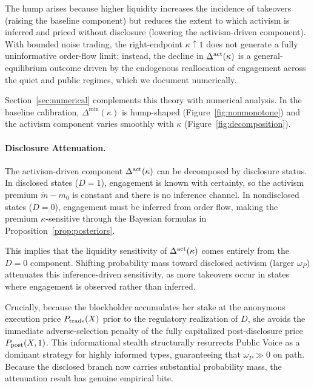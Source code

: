 \documentclass[11pt]{article}
\newcommand{\1}{\mathbf{1}}
\begin{document}
The hump arises because higher liquidity increases the incidence of takeovers (raising the baseline component) but reduces the extent to which activism is inferred and priced without disclosure (lowering the activism-driven component). With bounded noise trading, the right-endpoint $\kappa\uparrow 1$ does not generate a fully uninformative order-flow limit; instead, the decline in $\Delta^{\textup{act}}(\kappa)$ is a general-equilibrium outcome driven by the endogenous reallocation of engagement across the quiet and public regimes, which we document numerically.

Section~\ref{sec:numerical} complements this theory with numerical analysis. In the baseline calibration, $\Delta^{\min}(\kappa)$ is hump-shaped (Figure~\ref{fig:nonmonotone}) and the activism component varies smoothly with $\kappa$ (Figure~\ref{fig:decomposition}).

%
\paragraph{Disclosure Attenuation.}
%

The activism-driven component $\Delta^{\textup{act}}(\kappa)$ can be decomposed by disclosure status. In disclosed states ($D=1$), engagement is known with certainty, so the activism premium $\tilde{m}-m_0$ is constant and there is no inference channel. In nondisclosed states ($D=0$), engagement must be inferred from order flow, making the premium $\kappa$-sensitive through the Bayesian formulas in Proposition~\ref{prop:posteriors}.

This implies that the liquidity sensitivity of $\Delta^{\textup{act}}(\kappa)$ comes entirely from the $D=0$ component. Shifting probability mass toward disclosed activism (larger $\omega_P$) attenuates this inference-driven sensitivity, as more takeovers occur in states where engagement is observed rather than inferred.

Crucially, because the blockholder accumulates her stake at the anonymous execution price $P_{\textup{trade}}(X)$ prior to the regulatory realization of $D$, she avoids the immediate adverse-selection penalty of the fully capitalized post-disclosure price $P_{\textup{post}}(X,1)$. This informational stealth structurally resurrects Public Voice as a dominant strategy for highly informed types, guaranteeing that $\omega_P \gg 0$ on path. Because the disclosed branch now carries substantial probability mass, the attenuation result has genuine empirical bite.
\end{document}
